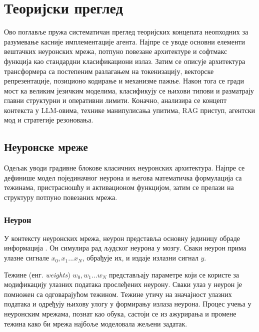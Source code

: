 \chapter{Теоријски преглед}
\label{sec:2}

Ово поглавље пружа систематичан преглед теоријских концепата неопходних за разумевање касније имплементације агента. Најпре се уводе основни елементи вештачких неуронских мрежа, потпуно повезане архитектуре и софтмакс функција као стандардни класификациони излаз. Затим се описује архитектура трансформера са постепеним разлагањем на токенизацију, векторске репрезентације, позиционо кодирање и механизме пажње. Након тога се гради мост ка великим језичким моделима, класификују се њихови типови и разматрају главни структурни и оперативни лимити. Коначно, анализира се концепт контекста у LLM-овима, технике манипулисања упитима, RAG приступ, агентски мод и стратегије резоновања.

\section{Неуронске мреже}
\label{sec:2.1}

Одељак уводи градивне блокове класичних неуронских архитектура. Најпре се дефинише модел појединачног неурона и његова математичка формулација са тежинама, пристрасношћу и активационом функцијом, затим се прелази на структуру потпуно повезаних мрежа.

\subsection{Неурон}
\label{sec:2.1.1}

У контексту неуронских мрежа, неурон представља основну јединицу обраде информација \cite{noauthor_artificial_20233}. 
Он симулира рад људског неурона у мозгу. 
Сваки неурон прима улазне сигнале $x_0, x_1 ... x_N$, обрађује их, и издаје излазни сигнал $y$.
\newline

Тежине (енг. \textit{weights}) $w_0, w_1 ... w_N$ представљају параметре који се користе за модификацију улазних података прослеђених неурону. 
Сваки улаз у неурон је помножен са одговарајућом тежином. Тежине утичу на значајност улазних података и одређују њихову улогу у формирању излаза неурона. 
Процес учења у неуронским мрежама, познат као обука, састоји се из ажурирања и промене тежина како би мрежа најбоље моделовала жељени задатак.
\newline

